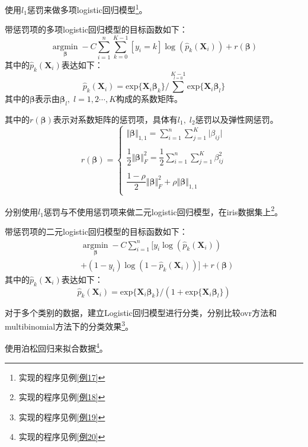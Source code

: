 \begin{Example}
	使用$l_1$惩罚来做多项logistic回归模型\footnote{实现的程序见例\ref{例17}}。

	带惩罚项的多项logistic回归模型的目标函数如下：
	\[
	\mathop{\arg\min}\limits_{\bm{\beta}}-C\sum^n_{i=1}\sum^{K-1}_{k=0}	[y_i=k]\log(\hat{p}_k(\bm{X}_i))+r(\bm{\beta})
	\]
	其中的$\hat{p}_k(\bm{X}_i)$表达如下：
	\[
		\hat{p}_k(\bm{X}_i)=\mathrm{exp}\{\bm{X}_i\bm{\beta}_k\}/\sum^{K-1}\limits_{l=0}\mathrm{exp}\{\bm{X}_i\bm{\beta}_l\}
	\]
	其中的$\bm{\beta}$表示由$\bm{\beta}_l,\;l=1,2\cdots,K$构成的系数矩阵。
	
	其中的$r(\bm{\beta})$表示对系数矩阵的惩罚项，具体有$l_1,\;l_2$惩罚以及弹性网惩罚。
	\[
	r(\bm{\beta})=\left\{\begin{array}{l}
		\Vert \bm{\beta}\Vert_{1,1}=\sum^n_{i=1}\sum^K_{j=1}\vert\beta_{ij}\vert\\
		\\
		\dfrac{1}{2}\Vert \bm{\beta}\Vert^2_{F}=\dfrac{1}{2}\sum^n_{i=1}\sum^K_{j=1}\beta^2_{ij}\\
		\\
		\dfrac{1-\rho}{2}\Vert \bm{\beta}\Vert^2_{F}+\rho\Vert \bm{\beta}\Vert_{1,1}\\
	\end{array}\right.
	\]
\end{Example}

\begin{Example}
	分别使用$l_1$惩罚与不使用惩罚项来做二元logistic回归模型，在iris数据集上\footnote{实现的程序见例\ref{例18}}。

	带惩罚项的二元logistic回归模型的目标函数如下：
	\[
	\begin{aligned}
	&\mathop{\arg\min}\limits_{\bm{\beta}}-C\sum^n_{i=1}[y_i\log(\hat{p}_k(\bm{X}_i))\\
	&+(1-y_i)\log(1-\hat{p}_k(\bm{X}_i))]+r(\bm{\beta})
	\end{aligned}
	\]
	其中的$\hat{p}_k(\bm{X}_i)$表达如下：
	\[
		\hat{p}_k(\bm{X}_i)=\mathrm{exp}\{\bm{X}_i\bm{\beta}_k\}/(1+\mathrm{exp}\{\bm{X}_i\bm{\beta}_l\})
	\]
\end{Example}

\begin{Example}
	对于多个类别的数据，建立Logistic回归模型进行分类，分别比较ovr方法和multibinomial方法下的分类效果\footnote{实现的程序见例\ref{例19}}。
\end{Example}

\begin{Example}
	使用泊松回归来拟合数据\footnote{实现的程序见例\ref{例20}}。
\end{Example}

